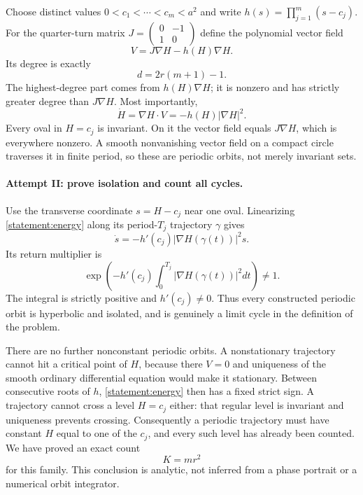 \documentclass[11pt,a4paper]{article}
\numberwithin{equation}{section}
\begin{document}
Choose distinct values $0<c_1<\cdots<c_m<a^2$ and write
$h(s)=\prod_{j=1}^m(s-c_j)$.  For the quarter-turn matrix
$J=\begin{pmatrix}0&-1\\1&0\end{pmatrix}$ define the polynomial vector
field
\begin{equation}\label{statement:field}
 V=J\nabla H-h(H)\nabla H.
\end{equation}
Its degree is exactly
\begin{equation}\label{statement:degree}
 d=2r(m+1)-1.
\end{equation}
The highest-degree part comes from $h(H)\nabla H$; it is nonzero and
has strictly greater degree than $J\nabla H$.
Most importantly,
\begin{equation}\label{statement:energy}
 \dot H=\nabla H\cdot V=-h(H)|\nabla H|^2.
\end{equation}
Every oval in $H=c_j$ is invariant.  On it the vector field equals
$J\nabla H$, which is everywhere nonzero.  A smooth nonvanishing
vector field on a compact circle traverses it in finite period,
so these are periodic orbits, not merely invariant sets.

\paragraph{Attempt II: prove isolation and count all cycles.}
Use the transverse coordinate $s=H-c_j$ near one oval.  Linearizing
\eqref{statement:energy} along its period-$T_j$ trajectory $\gamma$ gives
\[
 \dot s=-h'(c_j)|\nabla H(\gamma(t))|^2s.
\]
Its return multiplier is
\begin{equation}\label{statement:multiplier}
 \exp\!\left(-h'(c_j)\int_0^{T_j}
                      |\nabla H(\gamma(t))|^2dt\right)\ne1.
\end{equation}
The integral is strictly positive and $h'(c_j)\ne0$.  Thus every
constructed periodic orbit is hyperbolic and isolated, and is genuinely
a limit cycle in the definition of the problem.

There are no further nonconstant periodic orbits.  A nonstationary
trajectory cannot hit a critical point of $H$, because there $V=0$
and uniqueness of the smooth ordinary differential equation would make
it stationary.  Between consecutive roots of $h$, \eqref{statement:energy}
then has a fixed strict sign.  A trajectory cannot cross a level
$H=c_j$ either: that regular level is invariant and uniqueness prevents
crossing.  Consequently a periodic trajectory must have constant $H$
equal to one of the $c_j$, and every such level has already been counted.
We have proved an exact count
\begin{equation}\label{statement:count}
 K=mr^2
\end{equation}
for this family.  This conclusion is analytic, not inferred from a phase
portrait or a numerical orbit integrator.
\end{document}
